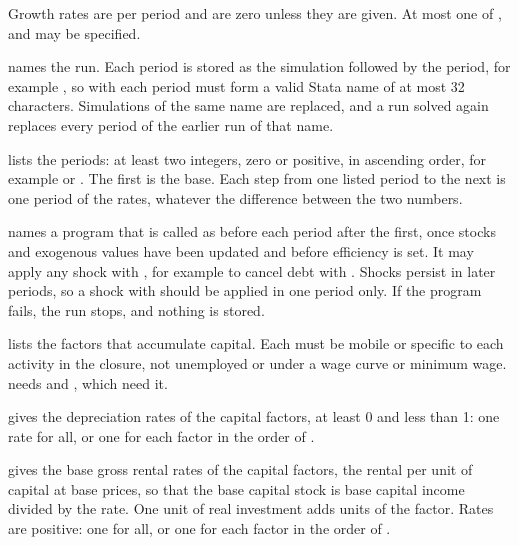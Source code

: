 Growth rates are per period and are zero unless they are given. At most one
of ,  and  may be specified.


\begin{optdesc}
\item[\optarg{}{name}{name}] names the run. Each period is stored as the
simulation  followed by the period, for example , so
 with each period must form a valid Stata name of at most 32
characters. Simulations of the same name are replaced, and a run solved again
replaces every period of the earlier run of that name.

\item[\optarg{per}{iods}{numlist}] lists the periods: at least two integers,
zero or positive, in ascending order, for example  or
. The first is the base. Each step from one listed period to
the next is one period of the rates, whatever the difference between the two
numbers.

\item[\optarg{shock}{s}{program}] names a program that is called as
 before each period after the first, once stocks and
exogenous values have been updated and before efficiency is set. It may apply
any shock with , for example to cancel debt with
. Shocks persist in later periods, so a shock with
 should be applied in one period only. If the program fails, the
run stops, and nothing is stored.

\item[\optarg{cap}{ital}{factors}] lists the factors that accumulate capital.
Each must be mobile or specific to each activity in the closure, not
unemployed or under a wage curve or minimum wage.  needs
 and , which need it.

\item[\optarg{dep}{reciation}{numlist}] gives the depreciation rates of the
capital factors, at least 0 and less than 1: one rate for all, or one for each
factor in the order of .

\item[\optarg{rent}{al}{numlist}] gives the base gross rental rates of the
capital factors, the rental per unit of capital at base prices, so that the
base capital stock is base capital income divided by the rate. One unit of
real investment adds  units of the factor. Rates are positive:
one for all, or one for each factor in the order of .


\end{optdesc}
